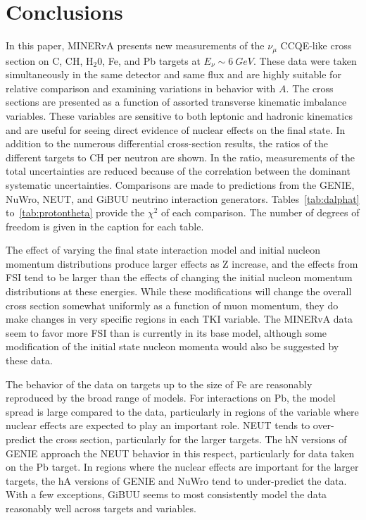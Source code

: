 \documentclass[aps,prd,twocolumn,showpacs,superscriptaddress,floatfix]{revtex4-2}  %
\begin{document}
\section{Conclusions}

In this paper, MINERvA presents new measurements of the $\nu_{\mu}$ CCQE-like cross section on C, CH, H$_2$0, Fe, and Pb targets at $E_\nu\sim 6~GeV$.  These data were taken simultaneously in the same detector and same flux and are highly suitable for relative comparison and examining variations in behavior with $A$. 
 The cross sections are presented as a function of assorted transverse kinematic imbalance variables.  These variables are sensitive to both leptonic and hadronic kinematics and are useful for seeing direct evidence of nuclear effects on the final state.  In addition to the numerous differential cross-section results, the ratios  of the different targets to CH per neutron  are shown.  In the ratio, measurements of the total uncertainties are reduced because of the correlation between the dominant systematic uncertainties.  Comparisons are made to  predictions from the GENIE, NuWro, NEUT, and GiBUU neutrino interaction generators.  Tables~\ref{tab:dalphat} to~\ref{tab:protontheta}  provide the $\chi^{2}$ of each comparison.  The number of degrees of freedom is given in the caption for each table.  

The effect of varying the final state interaction model and initial nucleon momentum distributions produce larger effects as Z increase, and the effects from FSI tend to be larger than the effects of changing the initial nucleon momentum distributions at these energies.  While these modifications will change the overall cross section somewhat uniformly as a function of muon momentum, they do make changes in very specific regions in each TKI variable.  The MINERvA data seem to favor more FSI than is currently in its base model, although some modification of the initial state nucleon momenta would also be suggested by these data. 

The behavior of the data on targets up to the size of Fe are reasonably reproduced by the broad range of models.  For interactions on Pb, the model spread is large compared to the data, particularly in regions of the variable where nuclear effects are expected to play an important role.  NEUT tends to over-predict the cross section, particularly for the larger targets.  The hN versions of GENIE approach the NEUT behavior in this respect, particularly for data taken on the Pb target.  In regions where the nuclear effects are important for the larger targets, the hA versions of GENIE and NuWro tend to under-predict the data.  With a few exceptions, GiBUU seems to most consistently model the data reasonably well across targets and variables.
\end{document}
